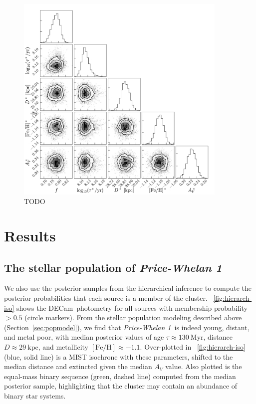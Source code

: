 \documentclass[modern]{aastex62}
\newcommand{\acronym}[1]{{\small{#1}}}
\newcommand{\decam}{DECam}
\newcommand{\sectionname}{Section}
\newcommand{\kpc}{\textrm{kpc}}
\newcommand{\feh}{\ensuremath{[\textrm{Fe} / \textrm{H}]}}
\newcommand{\clustername}{\textsl{Price-Whelan 1}}
\begin{document}
\begin{figure}
\centering
\includegraphics[width=0.9\textwidth]{figures/hierarch-corner.pdf}
\caption{TODO}
\label{fig:hierarch-corner}
\end{figure}


\section{Results} \label{sec:results}

\subsection{The stellar population of \clustername}
\label{sec:popchars}

We also use the posterior samples from the hierarchical inference to compute the posterior probabilities that each source is a member of the cluster.
\figurename~\ref{fig:hierarch-iso} shows the \decam\ photometry for all sources with membership probability $> 0.5$ (circle markers).
From the stellar population modeling described above (\sectionname~\ref{sec:popmodel}), we find that \clustername\ is indeed young, distant, and metal poor, with median posterior values of age $\tau \approx 130~\textrm{Myr}$, distance $D \approx 29~\kpc$, and metallicity $\feh \approx -1.1$.
Over-plotted in \figurename~\ref{fig:hierarch-iso} (blue, solid line) is a \acronym{MIST} isochrone with these parameters, shifted to the median distance and extincted given the median $A_V$ value.
Also plotted is the equal-mass binary sequence (green, dashed line) computed from the median posterior sample, highlighting that the cluster may contain an abundance of binary star systems.
\end{document}

